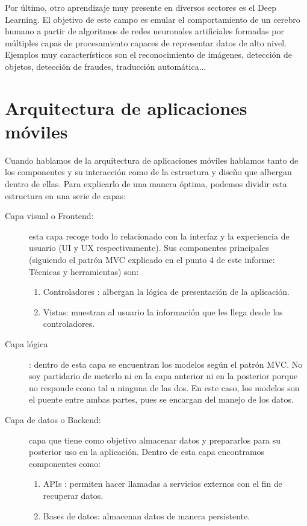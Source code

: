 	Por último, otro aprendizaje muy presente en diversos sectores es el Deep Learning. El objetivo de este campo es emular el comportamiento de un cerebro humano a partir de algoritmos de redes neuronales artificiales formadas por múltiples capas de procesamiento capaces de representar datos de alto nivel. Ejemplos muy característicos son el reconocimiento de imágenes, detección de objetos, detección de fraudes, traducción automática...
	
\section{Arquitectura de aplicaciones móviles}

	Cuando hablamos de la arquitectura de aplicaciones móviles hablamos tanto de los componentes y su interacción como de la estructura y diseño que albergan dentro de ellas. Para explicarlo de una manera óptima, podemos dividir esta estructura en una serie de capas:
	
	\begin{description}
		\item[Capa visual o Frontend:] esta capa recoge todo lo relacionado con la interfaz y la experiencia de usuario (UI y UX respectivamente). Sus componentes principales (siguiendo el patrón MVC explicado en el punto 4 de este informe: Técnicas y herramientas) son:
			\begin{enumerate}
				\item Controladores : albergan la lógica de presentación de la aplicación.
				\item Vistas: muestran al usuario la información que les llega desde los controladores.
			\end{enumerate}
		\item[Capa lógica]: dentro de esta capa se encuentran los modelos según el patrón MVC. No soy partidario de meterlo ni en la capa anterior ni en la posterior porque no responde como tal a ninguna de las dos. En este caso, los modelos son el puente entre ambas partes, pues se encargan del manejo de los datos.
		\item[Capa de datos o Backend:] capa que tiene como objetivo almacenar datos y prepararlos para su posterior uso en la aplicación. Dentro de esta capa encontramos componentes como:
			\begin{enumerate}
				\item APIs : permiten hacer llamadas a servicios externos con el fin de recuperar datos.
				\item Bases de datos: almacenan datos de manera persistente.
			\end{enumerate}
	\end{description}
	
